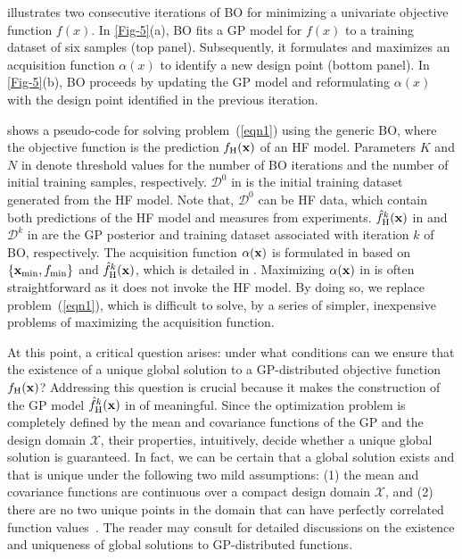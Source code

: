 \documentclass[journal ]{new-aiaa}
\newcommand{\edit}[1]{\textcolor{red}{#1}} %
\begin{document}
 illustrates two consecutive iterations of BO for minimizing a univariate objective function $f(x)$.
In \cref{Fig-5}(a), BO fits a GP model for $f(x)$ to a training dataset of six samples (top panel).
Subsequently, it formulates and maximizes an acquisition function $\alpha(x)$ to identify a new design point (bottom panel).
In \cref{Fig-5}(b), BO proceeds by updating the GP model and reformulating $\alpha(x)$ with the design point identified in the previous iteration.

 shows a pseudo-code for solving problem~(\ref{eqn1}) using the generic BO, where the objective function is the prediction $f_\text{H}(\bf x)$ of an HF model.
Parameters $K$ and $N$ in  denote threshold values for the number of BO iterations and the number of initial training samples, respectively.
$\mathcal{D}^{0}$ in  is the initial training dataset generated from the HF model.
Note that, $\mathcal{D}^{0}$ can be HF data, which contain both predictions of the HF model and measures from experiments.  
$\hat{f}_\text{H}^k({\bf x})$ in  and $\mathcal{D}^{k}$ in  are the GP posterior and training dataset associated with iteration $k$ of BO, respectively.
The acquisition function $\alpha({\bf x})$ is formulated in  based on $\{{\bf x}_{\min},f_{\min}\}$ and $\hat{f}_\text{H}^k({\bf x})$, which is detailed in .
Maximizing $\alpha({\bf x})$ in  is often straightforward as it does not invoke the HF model.
{By doing so, we replace problem~(\ref{eqn1}), which is difficult to solve, by a series of simpler, inexpensive problems of maximizing the acquisition function.}

{At this point, a critical question arises: under what conditions can we ensure that the existence of a unique global solution to a GP-distributed objective function ${f}_\text{H}({\bf x})$?
Addressing this question is crucial because it makes the construction of the GP model $\hat{f}_\text{H}^k({\bf x})$ in  of  meaningful.
Since the optimization problem is completely defined by the mean and covariance functions of the GP and the design domain $\mathcal{X}$, their properties, intuitively, decide whether a unique global solution is guaranteed.
In fact, we can be certain that a global solution exists and that is unique under the following two mild assumptions: (1) the mean and covariance functions are continuous over a compact design domain $\mathcal{X}$, and (2) there are no two unique points in the domain that can have perfectly correlated function values~\citep{Garnett2023}.
The reader may consult \citet{Garnett2023} for detailed discussions on the existence and uniqueness of global solutions to GP-distributed functions.} 
\end{document}
